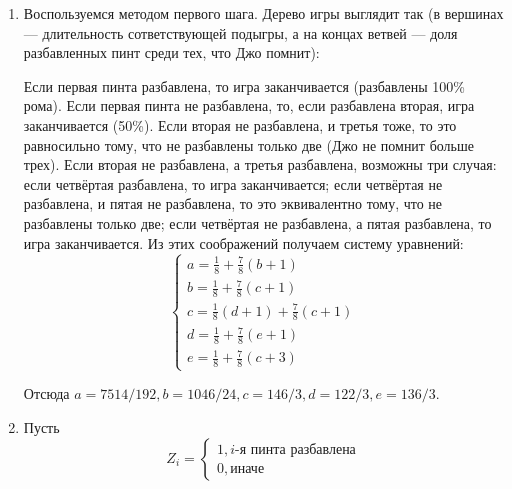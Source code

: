 \begin{enumerate}

\item Воспользуемся методом первого шага. Дерево игры выглядит так (в вершинах — длительность сответствующей подыгры, а на концах ветвей — доля разбавленных пинт среди тех, что Джо помнит):
\begin{center}
\end{center}

Если первая пинта разбавлена, то игра заканчивается (разбавлены 100\% рома).
Если первая пинта не разбавлена, то, если разбавлена вторая, игра заканчивается (50\%).
Если вторая не разбавлена, и третья тоже, то это равносильно тому, что не разбавлены только две (Джо не помнит больше трех).
Если вторая не разбавлена, а третья разбавлена, возможны три случая: если четвёртая разбавлена, то игра заканчивается;
если четвёртая не разбавлена, и пятая не разбавлена, то это эквивалентно тому, что не разбавлены только две;
если четвёртая не разбавлена, а пятая разбавлена, то игра заканчивается.
Из этих соображений получаем систему уравнений:
\[
\begin{cases}a=\frac{1}{8}+\frac{7}{8}(b+1)\\
b=\frac{1}{8}+\frac{7}{8}(c+1)\\
c=\frac{1}{8}(d+1)+\frac{7}{8}(c+1)\\
d=\frac{1}{8}+\frac{7}{8}(e+1)\\
e=\frac{1}{8}+\frac{7}{8}(c+3)
\end{cases}
\]

Отсюда $a=7514/192,b=1046/24,c=146/3,d=122/3,e=136/3$.

\item Пусть
\[
Z_i=\begin{cases}1, i \mbox{-я пинта разбавлена} \\
0, \mbox{иначе}
\end{cases}
\]


\end{enumerate}
